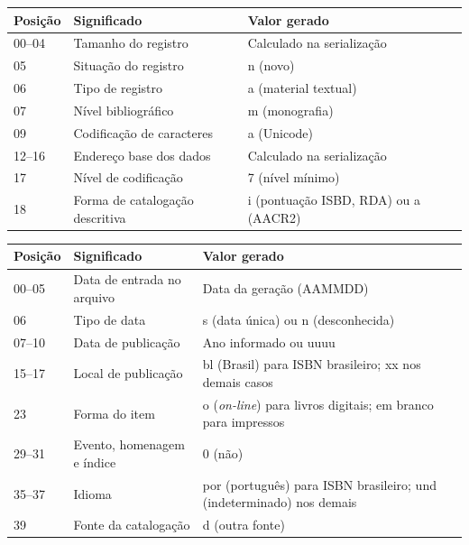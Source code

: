 \begin{quadro}[htb]
    \centering
    \caption{Posições do líder preenchidas pelo Cataloga+}
    \label{qua:marc-lider}
    \footnotesize
    \begin{tabular}{|p{}|p{}|p{}|}
        \hline
        \textbf{Posição} & \textbf{Significado} & \textbf{Valor gerado} \\ \hline
        00--04 & Tamanho do registro & Calculado na serialização \\ \hline
        05 & Situação do registro & n (novo) \\ \hline
        06 & Tipo de registro & a (material textual) \\ \hline
        07 & Nível bibliográfico & m (monografia) \\ \hline
        09 & Codificação de caracteres & a (Unicode) \\ \hline
        12--16 & Endereço base dos dados & Calculado na serialização \\ \hline
        17 & Nível de codificação & 7 (nível mínimo) \\ \hline
        18 & Forma de catalogação descritiva & i (pontuação ISBD, RDA) ou a (AACR2) \\ \hline
    \end{tabular}
\end{quadro}

\begin{quadro}[htb]
    \centering
    \caption{Posições do campo 008 preenchidas pelo Cataloga+}
    \label{qua:marc-008}
    \footnotesize
    \begin{tabular}{|p{}|p{}|p{}|}
        \hline
        \textbf{Posição} & \textbf{Significado} & \textbf{Valor gerado} \\ \hline
        00--05 & Data de entrada no arquivo & Data da geração (AAMMDD) \\ \hline
        06 & Tipo de data & s (data única) ou n (desconhecida) \\ \hline
        07--10 & Data de publicação & Ano informado ou uuuu \\ \hline
        15--17 & Local de publicação & bl (Brasil) para ISBN brasileiro; xx nos demais casos \\ \hline
        23 & Forma do item & o (\textit{on-line}) para livros digitais; em branco para impressos \\ \hline
        29--31 & Evento, homenagem e índice & 0 (não) \\ \hline
        35--37 & Idioma & por (português) para ISBN brasileiro; und (indeterminado) nos demais \\ \hline
        39 & Fonte da catalogação & d (outra fonte) \\ \hline
    \end{tabular}
\end{quadro}

